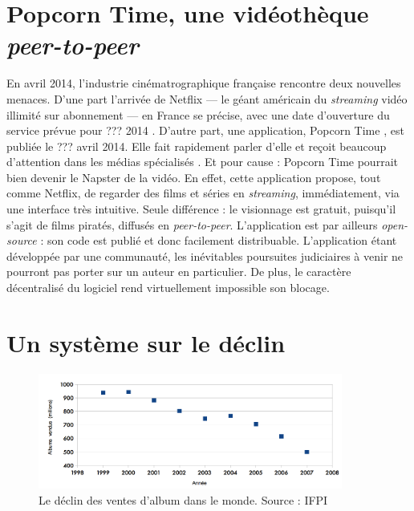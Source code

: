 \documentclass[a4paper]{report}
\begin{document}
	\section{Popcorn Time, une vidéothèque \emph{peer-to-peer}}
	En avril 2014, l'industrie cinématrographique française rencontre deux nouvelles menaces. D'une part l'arrivée de Netflix — le géant américain du \emph{streaming} vidéo illimité sur abonnement — en France se précise, avec une date d'ouverture du service prévue pour ??? 2014  \cite{netflix-date-france} . D'autre part, une application, Popcorn Time  \cite{popcorn-time}, est publiée le ??? avril 2014. Elle fait rapidement parler d'elle et reçoit beaucoup d'attention dans les médias spécialisés \cite{popcorn-time-article}. Et pour cause : Popcorn Time pourrait bien devenir le Napster de la vidéo. En effet, cette application propose, tout comme Netflix, de regarder des films et séries en \emph{streaming}, immédiatement, via une interface très intuitive. Seule différence : le visionnage est gratuit, puisqu'il s'agit de films piratés, diffusés en \emph{peer-to-peer}. L'application est par ailleurs \emph{open-source} : son code est publié \cite{popcorn-time-github} et donc facilement distribuable. L'application étant développée par une communauté, les inévitables poursuites judiciaires à venir ne pourront pas porter sur un auteur en particulier. De plus, le caractère décentralisé du logiciel rend virtuellement impossible son blocage.

	\section{Un système sur le déclin}
	\label{declin-systeme}

	\begin{figure}[ht]
		\begin{center}
			\includegraphics[width=10cm]{images/ventes-albums.png}
			\caption{Le déclin des ventes d'album dans le monde. Source : IFPI}
		\end{center}
	\end{figure}
\end{document}
